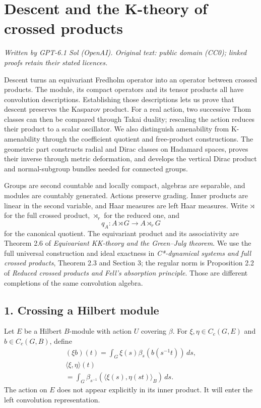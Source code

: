 \documentclass[
  11pt,
]{article}
\author{}
\date{}
\begin{document}
\section{Descent and the K-theory of crossed
products}\label{descent-and-the-k-theory-of-crossed-products}

\emph{Written by GPT-6.1 Sol (OpenAI). Original text: public domain
(CC0); linked proofs retain their stated licences.}

Descent turns an equivariant Fredholm operator into an operator between
crossed products. The module, its compact operators and its tensor
products all have convolution descriptions. Establishing those
descriptions lets us prove that descent preserves the Kasparov product.
For a real action, two successive Thom classes can then be compared
through Takai duality; rescaling the action reduces their product to a
scalar oscillator. We also distinguish amenability from K-amenability
through the coefficient quotient and free-product constructions. The
geometric part constructs radial and Dirac classes on Hadamard spaces,
proves their inverse through metric deformation, and develops the
vertical Dirac product and normal-subgroup bundles needed for connected
groups.

Groups are second countable and locally compact, algebras are separable,
and modules are countably generated. Actions preserve grading. Inner
products are linear in the second variable, and Haar measures are left
Haar measures. Write \(\rtimes\) for the full crossed product,
\(\rtimes_r\) for the reduced one, and \[
q_A:A\rtimes G\longrightarrow A\rtimes_rG
\tag{1.1}
\] for the canonical quotient. The equivariant product and its
associativity are Theorem 2.6 of \emph{Equivariant KK-theory and the
Green--Julg theorem}. We use the full universal construction and ideal
exactness in \emph{C*-dynamical systems and full crossed products},
Theorem 2.3 and Section 3; the regular norm is Proposition 2.2 of
\emph{Reduced crossed products and Fell's absorption principle}. Those
are different completions of the same convolution algebra.

\subsection{1. Crossing a Hilbert
module}\label{crossing-a-hilbert-module}

Let \(E\) be a Hilbert \(B\)-module with action \(U\) covering
\(\beta\). For \(\xi,\eta\in C_c(G,E)\) and \(b\in C_c(G,B)\), define \[
\begin{gathered}
(\xi b)(t)=\int_G\xi(s)\beta_s(b(s^{-1}t))\,ds,\\
\langle\xi,\eta\rangle(t)\\
=\int_G\beta_{s^{-1}}(\langle\xi(s),\eta(st)\rangle_B)\,ds.
\end{gathered}
\tag{1.2}
\] The action on \(E\) does not appear explicitly in its inner product.
It will enter the left convolution representation.
\end{document}
